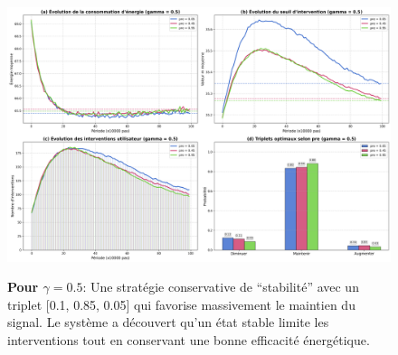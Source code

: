 \documentclass[a4paper,11pt]{article}
\begin{document}
\begin{figure}[!htbp]
    \begin{minipage}[c]{0.48\textwidth}
        \includegraphics[width=\textwidth]{figures/experience4_gamma_0.5.png}
    \end{minipage}
    \hfill
    \begin{minipage}[c]{0.48\textwidth}
        \textbf{Pour $\gamma=0.5$}: Une stratégie conservative de ``stabilité'' avec un triplet [0.1, 0.85, 0.05] qui favorise massivement le maintien du signal. Le système a découvert qu'un état stable limite les interventions tout en conservant une bonne efficacité énergétique.
    \end{minipage}
    
    \vspace{1em}
    \end{figure}
\end{document}

